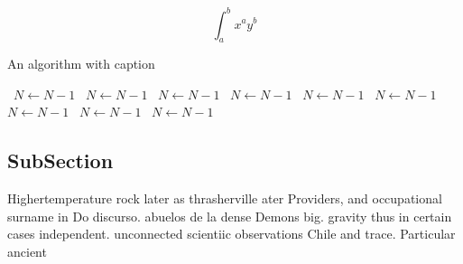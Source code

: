 \documentclass[a4paper]{article}
\begin{document}
\[ \int_{a}^{b}{x^{a}y^{b}} \]

\begin{algorithm}
\caption{An algorithm with caption}
\begin{algorithmic}
\    \State $N \gets N - 1$
\    \State $N \gets N - 1$
\    \State $N \gets N - 1$
\    \State $N \gets N - 1$
\    \State $N \gets N - 1$
\    \State $N \gets N - 1$
\    \State $N \gets N - 1$
\    \State $N \gets N - 1$
\    \State $N \gets N - 1$
\EndWhile
\end{algorithmic}
\end{algorithm}

\subsection{SubSection}

Highertemperature rock later as thrasherville ater Providers, and occupational surname in Do discurso. abuelos de la dense Demons big. gravity thus in certain cases independent. unconnected scientiic observations Chile and trace. Particular ancient 
\end{document}

